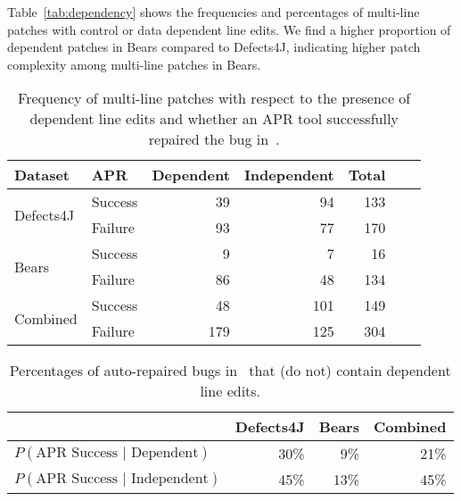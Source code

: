 \documentclass[sigconf, timestamp-false, anonymous=true]{acmart}
\begin{document}
Table~\ref{tab:dependency} shows the 
frequencies and percentages of multi-line patches with control or data dependent 
line edits. We find a higher proportion of dependent patches in Bears compared to 
Defects4J, indicating higher patch complexity among multi-line patches in Bears.


\begin{table}
{\begin{center}
	\begin{tabular}{l | l | r r r r | r}
		\toprule
		Dataset & APR & Dependent & Independent & Total \\
		\midrule
		\multirow{2}{*}{Defects4J} & Success & 39 & 94 & 133 \\
		                                          & Failure   & 93 & 77 & 170 \\
		\midrule
		\multirow{2}{*}{Bears}       & Success &   9 &   7 &   16 \\
		                                          & Failure   & 86 & 48 & 134 \\
		\midrule
		\multirow{2}{*}{Combined}& Success & 48 &101& 149 \\
		                                          & Failure   &179&125& 304 \\
	\end{tabular}
 \end{center}
}
	\caption{Frequency of multi-line patches with respect to the presence of 
	dependent line edits and whether an APR tool successfully 
	repaired the bug in~\cite{durieux-repair-them-all}.}
	\label{tab:dependency-repair-contingency-table}
\end{table}

\begin{table}
{\begin{center}
	\begin{tabular}{l | rrr}
            	\toprule
		& Defects4J & Bears & Combined \\
		\midrule
		$P(\mbox{APR Success } | \mbox{ Dependent})$ & 30\% & 9\% & 21\% \\
		$P(\mbox{APR Success } | \mbox{ Independent})$ & 45\% & 13\% & 45\% \\
		\bottomrule
	\end{tabular}
 \end{center}
}
	\caption{Percentages of auto-repaired bugs in~\cite{durieux-repair-them-all} 
	that (do not) contain dependent line edits.}
	\label{tab:dependency-repair-percents}
\end{table}
\end{document}
